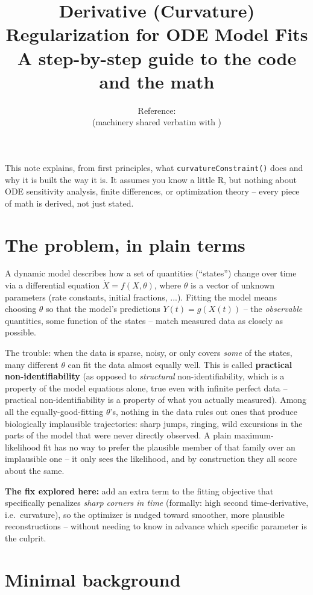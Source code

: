 \documentclass[11pt]{article}
\title{Derivative (Curvature) Regularization for ODE Model Fits\\[2pt]
\large A step-by-step guide to the code and the math}
\author{}
\date{Reference: \file{scripts/derivative\_constraint\_relay.R}\\(machinery shared verbatim with \file{scripts/derivative\_constraint.R})}
\newcommand{\code}[1]{\texttt{#1}}
\begin{document}
\maketitle

This note explains, from first principles, what \code{curvatureConstraint()}
does and why it is built the way it is. It assumes you know a little R, but
nothing about ODE sensitivity analysis, finite differences, or optimization
theory -- every piece of math is derived, not just stated.

\tableofcontents

\section{The problem, in plain terms}

A dynamic model describes how a set of quantities (``states'') change over
time via a differential equation $\dot{X} = f(X,\theta)$, where $\theta$ is
a vector of unknown parameters (rate constants, initial fractions, ...).
Fitting the model means choosing $\theta$ so that the model's predictions
$Y(t) = g(X(t))$ -- the \emph{observable} quantities, some function of the
states -- match measured data as closely as possible.

The trouble: when the data is sparse, noisy, or only covers \emph{some} of
the states, many different $\theta$ can fit the data almost equally well.
This is called \textbf{practical non-identifiability} (as opposed to
\emph{structural} non-identifiability, which is a property of the model
equations alone, true even with infinite perfect data -- practical
non-identifiability is a property of what you actually measured). Among all
the equally-good-fitting $\theta$'s, nothing in the data rules out ones that
produce biologically implausible trajectories: sharp jumps, ringing, wild
excursions in the parts of the model that were never directly observed.
A plain maximum-likelihood fit has no way to prefer the plausible member of
that family over an implausible one -- it only sees the likelihood, and by
construction they all score about the same.

\textbf{The fix explored here:} add an extra term to the fitting objective
that specifically penalizes \emph{sharp corners in time} (formally: high
second time-derivative, i.e.\ curvature), so the optimizer is nudged toward
smoother, more plausible reconstructions -- without needing to know in
advance which specific parameter is the culprit.

\section{Minimal background}
\end{document}
